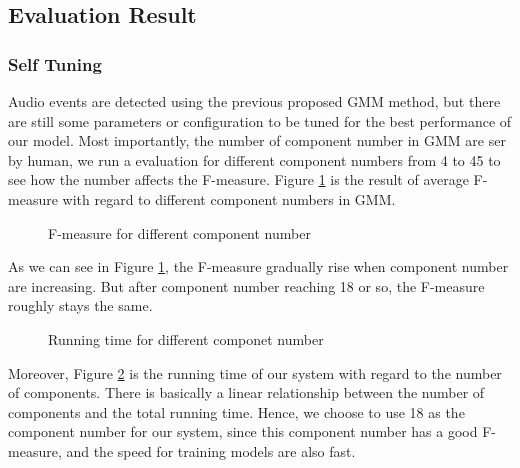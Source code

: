 \subsection{Evaluation Result}

\subsubsection{Self Tuning}
Audio events are detected using the previous proposed GMM method, but there are still some parameters or configuration to be tuned for the best performance of our model.
Most importantly, the number of component number in GMM are ser by human, we run a evaluation for different component numbers from 4 to 45 to see how the number affects the F-measure. 
Figure \ref{fig:component} is the result of average F-measure with regard to different component numbers in GMM. 
\begin{figure}[htb!]
\centering

\caption{F-measure for different component number}
\label{fig:component}
\end{figure}

As we can see in Figure \ref{fig:component}, the F-measure gradually rise when component number are increasing. 
But after component number reaching 18 or so, the F-measure roughly stays the same.  

\begin{figure}[htb!]
\centering

\caption{Running time for different componet number}
\label{fig:componentTime}
\end{figure}
Moreover, Figure \ref{fig:componentTime} is the running time of our system with regard to the number of components. 
There is basically a linear relationship between the number of components and the total running time. 
Hence, we choose to use 18 as the component number for our system, since this component number has a good F-measure, and the speed for training models are also fast.

